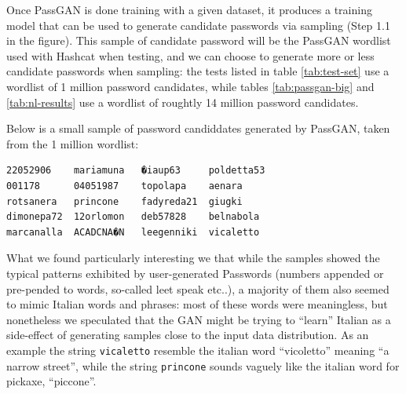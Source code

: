 Once PassGAN is done training with a given dataset, it produces a training model that can be used to generate candidate passwords via sampling (Step 1.1 in the figure). This sample of candidate password will be the PassGAN wordlist used with Hashcat when testing, and we can choose to generate more or less candidate passwords when sampling: the tests listed in table \ref{tab:test-set} use a wordlist of 1 million password candidates, while tables \ref{tab:passgan-big} and \ref{tab:nl-results} use a wordlist of roughtly 14 million password candidates.




Below is a small sample of password candiddates generated by PassGAN, taken from the 1 million wordlist: %
\begin{verbatim}
22052906    mariamuna   �iaup63     poldetta53
001178      04051987    topolapa    aenara
rotsanera   princone    fadyreda21  giugki
dimonepa72  12orlomon   deb57828    belnabola
marcanalla  ACADCNA�N   leegenniki  vicaletto
\end{verbatim}

What we found particularly interesting we that while the samples showed the typical patterns exhibited by user-generated Passwords (numbers appended or pre-pended to words, so-called leet speak etc..), a majority of them also seemed to mimic Italian words and phrases: most of these words were meaningless, but nonetheless we speculated that the GAN might be trying to \enquote{learn} Italian as a side-effect of generating samples close to the input data distribution.
As an example the string \texttt{vicaletto} resemble the italian word \enquote{vicoletto} meaning \enquote{a narrow street}, while the string \texttt{princone} sounds vaguely like the italian word for pickaxe, \enquote{piccone}. 

